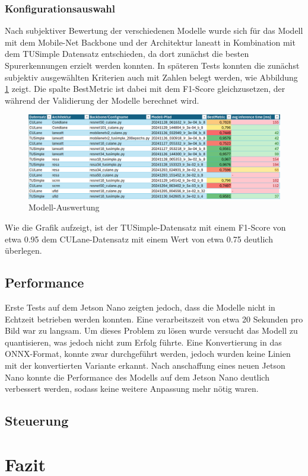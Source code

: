 \documentclass{article}
\begin{document}
            \subsubsection{Konfigurationsauswahl}
                Nach subjektiver Bewertung der verschiedenen Modelle wurde sich für das Modell mit dem Mobile-Net Backbone und der Architektur laneatt in Kombination mit dem TUSimple Datensatz entschieden, da dort zunächst die besten Spurerkennungen erzielt werden konnten.
                In späteren Tests konnten die zunächst subjektiv ausgewählten Kriterien auch mit Zahlen belegt werden, wie Abbildung \ref{fig:Modell_Auswertung} zeigt.
                Die spalte BestMetric ist dabei mit dem F1-Score gleichzusetzen, der während der Validierung der Modelle berechnet wird.
                \begin{figure}[h!]
                    \includegraphics[width=\linewidth]{Auswertung_BackBone_Datensatz.png}
                    \caption{Modell-Auswertung}
                    \label{fig:Modell_Auswertung}
                \end{figure}
                Wie die Grafik aufzeigt, ist der TUSimple-Datensatz mit einem F1-Score von etwa 0.95 dem CULane-Datensatz mit einem Wert von etwa 0.75 deutlich überlegen.

        \subsection{Performance}

            
            Erste Tests auf dem Jetson Nano zeigten jedoch, dass die Modelle nicht in Echtzeit betrieben werden konnten. Eine verarbeitszeit von etwa 20 Sekunden pro Bild war zu langsam.
            Um dieses Problem zu lösen wurde versucht das Modell zu quantisieren, was jedoch nicht zum Erfolg führte.
            Eine Konvertierung in das ONNX-Format, konnte zwar durchgeführt werden, jedoch wurden keine Linien mit der konvertierten Variante erkannt.
            Nach anschaffung eines neuen Jetson Nano konnte die Performance des Modells auf dem Jetson Nano deutlich verbessert werden, sodass keine weitere Anpassung mehr nötig waren.
        \subsection{Steuerung}
    \section{Fazit}
\end{document}
